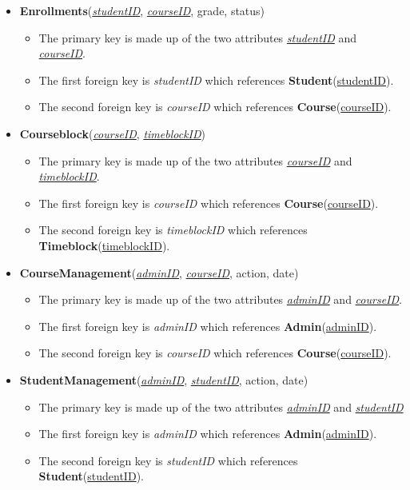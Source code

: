 \documentclass{report}
\begin{document}
\begin{itemize}
    \item \textbf{Enrollments}(\underline{\textit{studentID}}, \underline{\textit{courseID}}, grade, status)
    \begin{itemize}
        \item The primary key is made up of the two attributes \underline{\textit{studentID}} and \underline{\textit{courseID}}.
        \item The first foreign key is \textit{studentID} which references \textbf{Student}(\underline{studentID}).
        \item The second foreign key is \textit{courseID} which references \textbf{Course}(\underline{courseID}).
    \end{itemize}

    \item \textbf{Courseblock}(\underline{\textit{courseID}}, \underline{\textit{timeblockID}})
    \begin{itemize}
        \item The primary key is made up of the two attributes \underline{\textit{courseID}} and \underline{\textit{timeblockID}}.
        \item The first foreign key is \textit{courseID} which references \textbf{Course}(\underline{courseID}).
        \item The second foreign key is \textit{timeblockID} which references \textbf{Timeblock}(\underline{timeblockID}).
    \end{itemize}

    \item \textbf{CourseManagement}(\underline{\textit{adminID}}, \underline{\textit{courseID}}, action, date)
    \begin{itemize}
        \item The primary key is made up of the two attributes \underline{\textit{adminID}} and \underline{\textit{courseID}}.
        \item The first foreign key is \textit{adminID} which references \textbf{Admin}(\underline{adminID}).
        \item The second foreign key is \textit{courseID} which references \textbf{Course}(\underline{courseID}).
    \end{itemize}

    \item \textbf{StudentManagement}(\underline{\textit{adminID}}, \underline{\textit{studentID}}, action, date)
    \begin{itemize}
        \item The primary key is made up of the two attributes \underline{\textit{adminID}} and \underline{\textit{studentID}}
        \item The first foreign key is \textit{adminID} which references \textbf{Admin}(\underline{adminID}).
        \item The second foreign key is \textit{studentID} which references \textbf{Student}(\underline{studentID}).
    \end{itemize}

\end{itemize}
\end{document}
